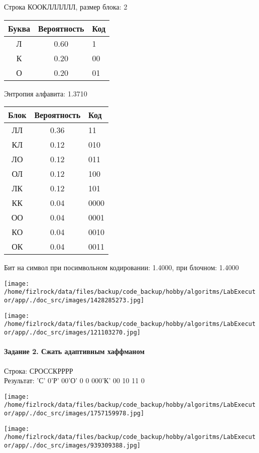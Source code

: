 \documentclass[a4paper, 12pt]{article}
\begin{document}
Строка КООКЛЛЛЛЛЛ, размер блока: 2
\begin{center}
 \begin{tabular}{ |c|c|l| } 
  \hline
     Буква & Вероятность & Код\\ \hline
Л & 0.60 & 1\\\hline
К & 0.20 & 00\\\hline
О & 0.20 & 01
\\ \hline \end{tabular}
\end{center}
Энтропия алфавита: 1.3710
\begin{center}
 \begin{tabular}{ |c|c|l| } 
  \hline
     Блок & Вероятность & Код\\ \hline
ЛЛ & 0.36 & 11\\\hline
КЛ & 0.12 & 010\\\hline
ЛО & 0.12 & 011\\\hline
ОЛ & 0.12 & 100\\\hline
ЛК & 0.12 & 101\\\hline
КК & 0.04 & 0000\\\hline
ОО & 0.04 & 0001\\\hline
КО & 0.04 & 0010\\\hline
ОК & 0.04 & 0011
\\ \hline \end{tabular}
\end{center}
Бит на символ при посимвольном кодировании: 1.4000, при блочном: 1.4000

\texttt{[image: /home/fizlrock/data/files/backup/code\_backup/hobby/algoritms/LabExecutor/app/./doc\_src/images/1428285273.jpg]}

\texttt{[image: /home/fizlrock/data/files/backup/code\_backup/hobby/algoritms/LabExecutor/app/./doc\_src/images/121103270.jpg]}
\pagebreak
\paragraph{Задание 2. Сжать адаптивным хаффманом\\}

Строка: 
СРОССКРРРР\\
Результат: 'С' 0'Р' 00'О' 0 0 000'К' 00 10 11 0

\texttt{[image: /home/fizlrock/data/files/backup/code\_backup/hobby/algoritms/LabExecutor/app/./doc\_src/images/1757159978.jpg]}

\texttt{[image: /home/fizlrock/data/files/backup/code\_backup/hobby/algoritms/LabExecutor/app/./doc\_src/images/939309388.jpg]}
\end{document}
